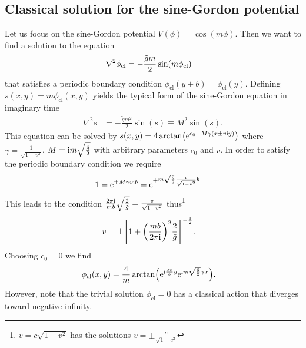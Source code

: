 \documentclass[english, parskip=full]{scrartcl}
\begin{document}
\subsection{Classical solution for the sine-Gordon potential}
Let us focus on the sine-Gordon potential $V(\phi) = \cos(m\phi)$.
Then we want to find a solution to the equation
\begin{align}
\nabla^2\phi_\text{cl} &= -\frac{\tilde{g} m}{2} \sin\kla*{m\phi_\text{cl}}
\end{align}
that satisfies a periodic boundary condition $\phi_\text{cl}(y+b) = \phi_\text{cl}(y)$.
Defining $s(x,y) = m\phi_\text{cl}(x,y)$ yields the typical form of the sine-Gordon equation in imaginary time
\begin{align}
\nabla^2s &= -\frac{\tilde{g} m^2}{2} \sin (s) \equiv M^2 \sin(s).
\end{align}
This equation can be solved by $s(x,y) = 4\arctan\kla*{\powe{c_0 + M\gamma \kla*{x \pm v\i y}}}$ where $\gamma = \frac{1}{\sqrt{1 - v^2}}$, $M = \text{i} m\sqrt{\frac{\tilde{g}}{2}}$ with arbitrary parameters $c_0$ and $v$.
In order to satisfy the periodic boundary condition we require
\begin{align}
1 &= \text{e}^{\pm M\gamma v\text{i} b} = \text{e}^{\mp m \sqrt{\frac{\tilde{g}}{2}} \frac{v}{\sqrt{1 - v^2}} b}.
\end{align}
This leads to the condition $\frac{2\pi\text{i}}{mb} \sqrt{\frac{2}{\tilde{g}}} = \frac{v}{\sqrt{1 - v^2}}$ thus\footnote{$v= c\sqrt{1 - v^2}$ has the solutions $v = \pm \frac{c}{\sqrt{1 + c^2}}$}
\begin{align}
v &= \pm \klb*{1 + \kla*{\frac{mb}{2\pi\i }}^2 \frac{2}{\tilde{g}}}^{-\frac{1}{2}}.
\end{align}
Choosing $c_0=0$ we find
\begin{align}
\phi_\text{cl}(x,y) &= \frac{4}{m} \arctan\kla*{\powe{\i \frac{2\pi}{b} y} \powe{\i m \sqrt{\frac{\tilde{g}}{2}} \gamma x}}.
\end{align}
However, note that the trivial solution $\phi_\text{cl} = 0$ has a classical action that diverges toward negative infinity.
\end{document}
